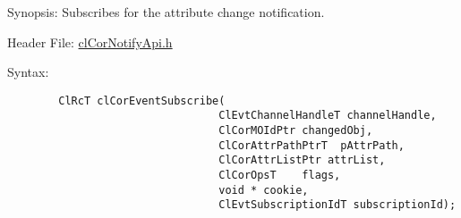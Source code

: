 \begin{Desc}
\item[Synopsis:]Subscribes for the attribute change notification.\end{Desc}
\begin{Desc}
\item[Header File:]\hyperlink{cl_cor_notify_api_8h}{cl\-Cor\-Notify\-Api.h}\end{Desc}
\begin{Desc}
\item[Syntax:]

\footnotesize\begin{verbatim}        ClRcT clCorEventSubscribe(
                                 ClEvtChannelHandleT channelHandle,
                                 ClCorMOIdPtr changedObj,
                                 ClCorAttrPathPtrT  pAttrPath,
                                 ClCorAttrListPtr attrList,
                                 ClCorOpsT    flags,
                                 void * cookie,
                                 ClEvtSubscriptionIdT subscriptionId);
\end{verbatim}
\normalsize
\end{Desc}
